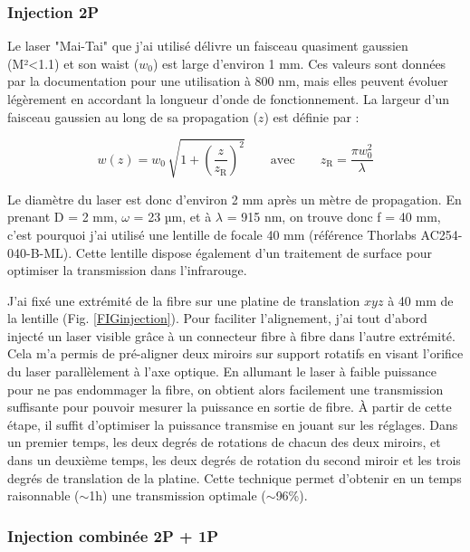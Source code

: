 \subsubsection{Injection 2P}

Le laser "Mai-Tai" que j'ai utilisé délivre un faisceau quasiment gaussien (M²<1.1) et son waist ($w_0$) est large d'environ 1 mm. Ces valeurs sont données par la documentation pour une utilisation à 800 nm, mais elles peuvent évoluer légèrement en accordant la longueur d'onde de fonctionnement. La largeur d'un faisceau gaussien au long de sa propagation ($z$) est définie par :

$$
w(z) = w_0 \, \sqrt{ 1+ {\left( \frac{z}{z_\mathrm{R}} \right)}^2 } \qquad \text{avec} \qquad
z_\mathrm{R} = \frac{\pi w_0^2 }{\lambda}
$$

Le diamètre du laser est donc d'environ 2 mm après un mètre de propagation. En prenant D = 2 mm, $\omega$ = 23 µm, et à $\lambda$ = 915 nm, on trouve donc f = 40 mm, c'est pourquoi j'ai utilisé une lentille de focale 40 mm (référence Thorlabs AC254-040-B-ML). Cette lentille dispose également d'un traitement de surface pour optimiser la transmission dans l'infrarouge.


J'ai fixé une extrémité de la fibre sur une platine de translation $xyz$ à 40 mm de la lentille (Fig. \ref{FIGinjection}). Pour faciliter l'alignement, j'ai tout d'abord injecté un laser visible grâce à un connecteur fibre à fibre dans l'autre extrémité. Cela m'a permis de pré-aligner deux miroirs sur support rotatifs en visant l'orifice du laser parallèlement à l'axe optique. En allumant le laser à faible puissance pour ne pas endommager la fibre, on obtient alors facilement une transmission suffisante pour pouvoir mesurer la puissance en sortie de fibre. À partir de cette étape, il suffit d'optimiser la puissance transmise en jouant sur les réglages. Dans un premier temps, les deux degrés de rotations de chacun des deux miroirs, et dans un deuxième temps, les deux degrés de rotation du second miroir et les trois degrés de translation de la platine. Cette technique permet d'obtenir en un temps raisonnable ($\sim$1h) une transmission optimale ($\sim$96\%).

\subsubsection{Injection combinée 2P + 1P}

